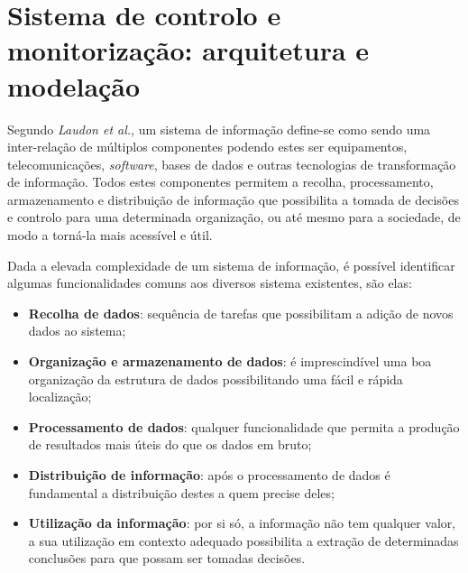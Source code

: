 

\chapter{Sistema de controlo e monitorização: arquitetura e modelação}










Segundo \textit{Laudon et al.}\cite{Laudon1998}, um sistema de informação define-se como sendo uma inter-relação de múltiplos componentes podendo estes ser equipamentos, telecomunicações, \textit{software}, bases de dados e outras tecnologias de transformação de informação. Todos estes componentes permitem a recolha, processamento, armazenamento e distribuição de informação que possibilita a tomada de decisões e controlo para uma determinada organização, ou até mesmo para a sociedade, de modo a torná-la mais acessível e útil.

Dada a elevada complexidade de um sistema de informação, é possível identificar algumas funcionalidades comuns aos diversos sistema existentes, são elas\cite{Turban1996}: 

\begin{itemize}
	\item \textbf{Recolha de dados}: sequência de tarefas que possibilitam a adição de novos dados ao sistema;
	
	\item \textbf{Organização e armazenamento de dados}: é imprescindível uma boa organização da estrutura de dados possibilitando uma fácil e rápida localização;
	
	\item \textbf{Processamento de dados}: qualquer funcionalidade que permita a produção de resultados mais úteis do que os dados em bruto; 
	
	\item \textbf{Distribuição de informação}: após o processamento de dados é fundamental a distribuição destes a quem precise deles; 
	
	\item \textbf{Utilização da informação}: por si só, a informação não tem qualquer valor, a sua utilização em contexto adequado possibilita a extração de determinadas conclusões para que possam ser tomadas decisões.
	
\end{itemize}


